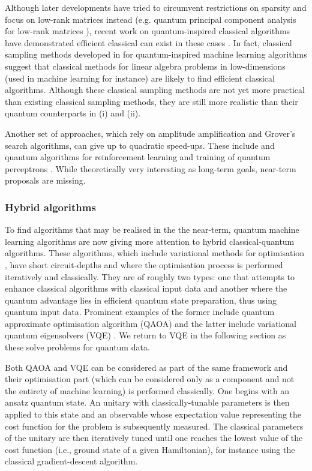 \documentclass[twocolumn, aps, rmp, amsmath, amssymb, nofootinbib, superscriptaddress, longbibliography, floatfix, table-of-contents, eqsecnum]{revtex4-2}
\begin{document}
Although later developments have tried to circumvent restrictions on sparsity and focus on low-rank matrices instead (e.g. quantum principal component analysis for low-rank matrices \cite{lloyd2014quantum}), recent work on quantum-inspired classical algorithms have demonstrated efficient classical can exist in these cases \cite{tang2018quantum, gilyen2018quantum, chia2018quantum}. In fact, classical sampling methods developed in \cite{tang2018quantum} for quantum-inspired machine learning algorithms suggest that classical methods for linear algebra problems in low-dimensions (used in machine learning for instance) are likely to find efficient classical algorithms. Although these classical sampling methods are not yet more practical than existing classical sampling methods, they are still more realistic than their quantum counterparts in (i) and (ii).

Another set of approaches, which rely on amplitude amplification and Grover's search algorithms, can give up to quadratic speed-ups. These include and quantum algorithms for reinforcement learning \cite{dunjko2016quantum} and training of quantum perceptrons \cite{kapoor2016quantum}. While theoretically very interesting as long-term goals, near-term proposals are missing.

\subsubsection{Hybrid algorithms}

To find algorithms that may be realised in the the near-term, quantum machine learning algorithms are now giving more attention to hybrid classical-quantum algorithms. These algorithms, which include variational methods for optimisation \cite{moll2018quantum}, have short circuit-depths and where the optimisation process is performed iteratively and classically. They are of roughly two types: one that attempts to enhance classical algorithms with classical input data and another where the quantum advantage lies in efficient quantum state preparation, thus using quantum input data. Prominent examples of the former include quantum approximate optimisation algorithm (QAOA) \cite{farhi2014quantum, farhi2016quantum} and the latter include variational quantum eigensolvers (VQE) \cite{peruzzo2014peruzzo, kandala2017hardware}. We return to VQE in the following section as these solve problems for quantum data.

Both QAOA and VQE can be considered as part of the same framework and their optimisation part (which can be considered only as a component and not the entirety of machine learning) is performed classically. One begins with an ansatz quantum state. An unitary with classically-tunable parameters is then applied to this state and an observable whose expectation value representing the cost function for the problem is subsequently measured. The classical parameters of the unitary are then iteratively tuned until one reaches the lowest value of the cost function (i.e., ground state of a given Hamiltonian), for instance using the classical gradient-descent algorithm. \
\end{document}
